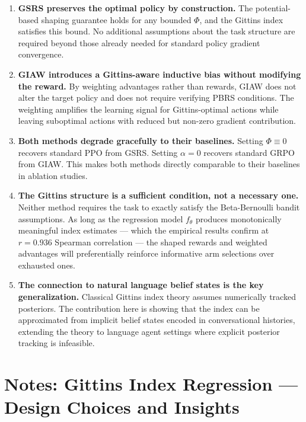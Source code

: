\documentclass[11pt]{article}
\theoremstyle{plain}
\theoremstyle{definition}
\theoremstyle{remark}
\begin{document}
\begin{enumerate}

\item \textbf{GSRS preserves the optimal policy by construction.} 
The potential-based shaping guarantee holds for any bounded $\Phi$, 
and the Gittins index satisfies this bound. No additional assumptions 
about the task structure are required beyond those already needed for 
standard policy gradient convergence.

\item \textbf{GIAW introduces a Gittins-aware inductive bias without 
modifying the reward.} By weighting advantages rather than rewards, 
GIAW does not alter the target policy and does not require verifying 
PBRS conditions. The weighting amplifies the learning signal for 
Gittins-optimal actions while leaving suboptimal actions with reduced 
but non-zero gradient contribution.

\item \textbf{Both methods degrade gracefully to their baselines.} 
Setting $\Phi \equiv 0$ recovers standard PPO from GSRS. Setting 
$\alpha = 0$ recovers standard GRPO from GIAW. This makes both 
methods directly comparable to their baselines in ablation studies.

\item \textbf{The Gittins structure is a sufficient condition, not a 
necessary one.} Neither method requires the task to exactly satisfy 
the Beta-Bernoulli bandit assumptions. As long as the regression 
model $f_\theta$ produces monotonically meaningful index estimates — 
which the empirical results confirm at $r = 0.936$ Spearman correlation 
— the shaped rewards and weighted advantages will preferentially 
reinforce informative arm selections over exhausted ones.

\item \textbf{The connection to natural language belief states is the 
key generalization.} Classical Gittins index theory assumes numerically 
tracked posteriors. The contribution here is showing that the index 
can be approximated from implicit belief states encoded in conversational 
histories, extending the theory to language agent settings where 
explicit posterior tracking is infeasible.

\end{enumerate}

\section{Notes: Gittins Index Regression — Design Choices and Insights}
\end{document}
